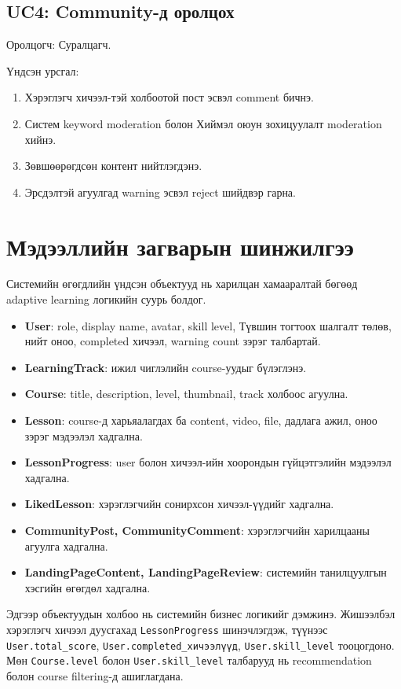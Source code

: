 \subsection{UC4: Community-д оролцох}
Оролцогч: Суралцагч.

Үндсэн урсгал:
\begin{enumerate}
\item Хэрэглэгч хичээл-тэй холбоотой пост эсвэл comment бичнэ.
\item Систем keyword moderation болон Хиймэл оюун зохицуулалт moderation хийнэ.
\item Зөвшөөрөгдсөн контент нийтлэгдэнэ.
\item Эрсдэлтэй агуулгад warning эсвэл reject шийдвэр гарна.
\end{enumerate}

\section{Мэдээллийн загварын шинжилгээ}
Системийн өгөгдлийн үндсэн объектууд нь харилцан хамааралтай бөгөөд adaptive learning логикийн суурь болдог.

\begin{itemize}
\item \textbf{User}: role, display name, avatar, skill level, Түвшин тогтоох шалгалт төлөв, нийт оноо, completed хичээл, warning count зэрэг талбартай.
\item \textbf{LearningTrack}: ижил чиглэлийн course-уудыг бүлэглэнэ.
\item \textbf{Course}: title, description, level, thumbnail, track холбоос агуулна.
\item \textbf{Lesson}: course-д харьяалагдах ба content, video, file, дадлага ажил, оноо зэрэг мэдээлэл хадгална.
\item \textbf{LessonProgress}: user болон хичээл-ийн хоорондын гүйцэтгэлийн мэдээлэл хадгална.
\item \textbf{LikedLesson}: хэрэглэгчийн сонирхсон хичээл-үүдийг хадгална.
\item \textbf{CommunityPost, CommunityComment}: хэрэглэгчийн харилцааны агуулга хадгална.
\item \textbf{LandingPageContent, LandingPageReview}: системийн танилцуулгын хэсгийн өгөгдөл хадгална.
\end{itemize}

Эдгээр объектуудын холбоо нь системийн бизнес логикийг дэмжинэ. Жишээлбэл хэрэглэгч хичээл дуусгахад \texttt{LessonProgress} шинэчлэгдэж, түүнээс \texttt{User.total\_score}, \texttt{User.completed\_хичээлүүд}, \texttt{User.skill\_level} тооцогдоно. Мөн \texttt{Course.level} болон \texttt{User.skill\_level} талбарууд нь recommendation болон course filtering-д ашиглагдана.

